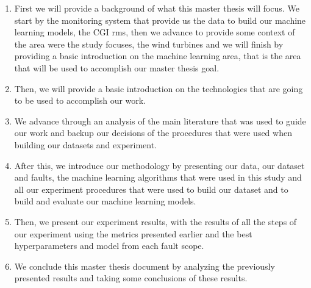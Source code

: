 \begin{enumerate}
    \item
First we will provide a background of what this master thesis will focus. We start by the monitoring system that provide us the data to build our machine learning models, the CGI \acrshort{rms}, then we advance to provide some context of the area were the study focuses, the wind turbines and we will finish by providing a basic introduction on the machine learning area, that is the area that will be used to accomplish our master thesis goal.

\item
Then, we will provide a basic introduction on the technologies that are going to be used to accomplish our work.

\item
We advance through an analysis of the main literature that was used to guide our work and backup our decisions of the procedures that were used when building our datasets and experiment.

\item
After this, we introduce our methodology by presenting our data, our dataset and faults, the machine learning algorithms that were used in this study and all our experiment procedures that were used to build our dataset and to build and evaluate our machine learning models.

\item
Then, we present our experiment results, with the results of all the steps of our experiment using the metrics presented earlier and the best hyperparameters and model from each fault scope.

\item
We conclude this master thesis document by analyzing the previously presented results and taking some conclusions of these results.

\end{enumerate}
